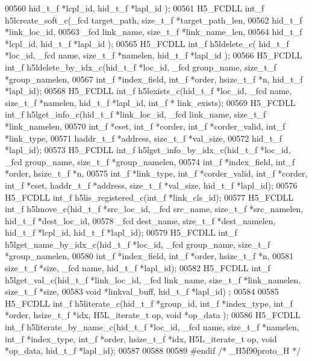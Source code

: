 \begin{DoxyCode}
00560                  hid\_t\_f *lcpl\_id, hid\_t\_f *lapl\_id );
00561 H5\_FCDLL int\_f h5lcreate\_soft\_c(\_fcd target\_path, size\_t\_f *target\_path\_len,
00562                  hid\_t\_f *link\_loc\_id,
00563                  \_fcd link\_name, size\_t\_f *link\_name\_len,
00564                  hid\_t\_f *lcpl\_id, hid\_t\_f *lapl\_id );
00565 H5\_FCDLL int\_f h5ldelete\_c( hid\_t\_f *loc\_id, \_fcd name, size\_t\_f *namelen, hid\_t\_f *lapl\_id );
00566 H5\_FCDLL int\_f h5ldelete\_by\_idx\_c(hid\_t\_f *loc\_id, \_fcd group\_name, size\_t\_f *group\_namelen,
00567                     int\_f *index\_field, int\_f *order, hsize\_t\_f *n, hid\_t\_f *lapl\_id);
00568 H5\_FCDLL int\_f h5lexists\_c(hid\_t\_f *loc\_id, \_fcd name, size\_t\_f *namelen, hid\_t\_f *lapl\_id, int\_f *
      link\_exists);
00569 H5\_FCDLL int\_f h5lget\_info\_c(hid\_t\_f *link\_loc\_id, \_fcd link\_name, size\_t\_f *link\_namelen,
00570                    int\_f *cset, int\_f *corder, int\_f *corder\_valid, int\_f *link\_type,
00571                    haddr\_t\_f *address, size\_t\_f *val\_size,
00572                    hid\_t\_f *lapl\_id);
00573 H5\_FCDLL int\_f h5lget\_info\_by\_idx\_c(hid\_t\_f *loc\_id, \_fcd group\_name, size\_t\_f *group\_namelen,
00574               int\_f *index\_field, int\_f *order, hsize\_t\_f *n,
00575               int\_f *link\_type, int\_f *corder\_valid, int\_f *corder, int\_f *cset, haddr\_t\_f *address, 
      size\_t\_f *val\_size, hid\_t\_f *lapl\_id);
00576 H5\_FCDLL int\_f h5lis\_registered\_c(int\_f *link\_cls\_id);
00577 H5\_FCDLL int\_f h5lmove\_c(hid\_t\_f *src\_loc\_id, \_fcd src\_name, size\_t\_f *src\_namelen, hid\_t\_f *dest\_loc\_id,
00578               \_fcd dest\_name, size\_t\_f *dest\_namelen, hid\_t\_f *lcpl\_id, hid\_t\_f *lapl\_id);
00579 H5\_FCDLL int\_f h5lget\_name\_by\_idx\_c(hid\_t\_f *loc\_id, \_fcd group\_name, size\_t\_f *group\_namelen,
00580                      int\_f *index\_field, int\_f *order, hsize\_t\_f *n,
00581                      size\_t\_f *size, \_fcd name, hid\_t\_f *lapl\_id);
00582 H5\_FCDLL int\_f h5lget\_val\_c(hid\_t\_f *link\_loc\_id, \_fcd link\_name, size\_t\_f *link\_namelen, size\_t\_f *size,
00583                  \textcolor{keywordtype}{void} *linkval\_buff, hid\_t\_f *lapl\_id) ;
00584 
00585 H5\_FCDLL int\_f h5literate\_c(hid\_t\_f *group\_id, int\_f *index\_type, int\_f *order, hsize\_t\_f *idx, 
      H5L\_iterate\_t op, \textcolor{keywordtype}{void} *op\_data );
00586 H5\_FCDLL int\_f h5literate\_by\_name\_c(hid\_t\_f *loc\_id, \_fcd name, size\_t\_f *namelen, int\_f *index\_type, int\_f
       *order, hsize\_t\_f *idx, H5L\_iterate\_t op, \textcolor{keywordtype}{void} *op\_data, hid\_t\_f *lapl\_id);
00587 
00588 
00589 \textcolor{preprocessor}{#endif }\textcolor{comment}{/* \_H5f90proto\_H */}\textcolor{preprocessor}{}
\end{DoxyCode}
